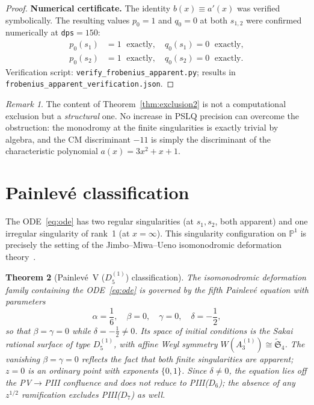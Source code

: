 \documentclass[11pt,a4paper]{article}
\newtheorem{theorem}{Theorem}[section]
\theoremstyle{definition}
\theoremstyle{remark}
\newtheorem{remark}[theorem]{Remark}
\begin{document}
\begin{proof}
\medskip
\noindent\textbf{Numerical certificate.}
The identity $b(x) \equiv a'(x)$
was verified symbolically.
The resulting values $p_0 = 1$ and
$q_0 = 0$ at both $s_{1,2}$ were
confirmed numerically at
\texttt{dps}$=150$:
\begin{align*}
  p_0(s_1) &= 1\;\text{ exactly},\quad
  q_0(s_1) = 0\;\text{ exactly},\\
  p_0(s_2) &= 1\;\text{ exactly},\quad
  q_0(s_2) = 0\;\text{ exactly}.
\end{align*}
Verification script:
\texttt{verify\_frobenius\_apparent.py};
results in\\
\texttt{frobenius\_apparent\_verification.json}.
\end{proof}

\begin{remark}
The content of Theorem~\ref{thm:exclusion2}
is not a computational exclusion but a
\emph{structural} one. No increase in PSLQ
precision can overcome the obstruction: the
monodromy at the finite singularities is
exactly trivial by algebra, and the CM
discriminant $-11$ is simply the discriminant
of the characteristic polynomial
$a(x)=3x^2+x+1$.
\end{remark}


\section{Painlev\'e classification}
\label{sec:painleve}

The ODE~\eqref{eq:ode} has two regular
singularities (at $s_1,s_2$, both apparent)
and one irregular singularity of rank~1
(at $x=\infty$). This singularity
configuration on $\mathbb{P}^1$ is precisely
the setting of the Jimbo--Miwa--Ueno
isomonodromic deformation
theory~\cite{jimbo1981}.

\begin{theorem}[Painlev\'e~V ($D_5^{(1)}$) classification]
\label{thm:painleve}
The isomonodromic deformation family
containing the ODE~\eqref{eq:ode} is
governed by the fifth Painlev\'e equation
with parameters
\[
  \alpha = \frac{1}{6},\quad
  \beta = 0,\quad
  \gamma = 0,\quad
  \delta = -\frac{1}{2},
\]
so that $\beta=\gamma=0$ while
$\delta=-\tfrac12\neq0$. Its space of
initial conditions is the Sakai rational
surface of type $D_5^{(1)}$, with affine
Weyl symmetry
$W(A_3^{(1)})\cong\widetilde{\mathfrak{S}}_4$.
The vanishing $\beta = \gamma = 0$ reflects
the fact that both finite singularities are
apparent; $z=0$ is an ordinary point with
exponents $\{0,1\}$. Since $\delta\neq0$,
the equation lies off the PV$\to$PIII
confluence and does not reduce to
PIII($D_6$); the absence of any $z^{1/2}$
ramification excludes PIII($D_7$) as well.
\end{theorem}
\end{document}

